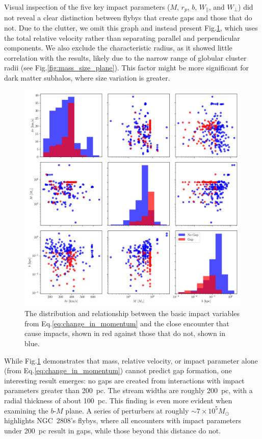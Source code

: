 \documentclass{aa}
\begin{document}
\begin{appendix}
      Visual inspection of the five key impact parameters ($M$, $r_p$, $b$, $W_\parallel$, and $W_\perp$) did not reveal a clear distinction between flybys that create gaps and those that do not. Due to the clutter, we omit this graph and instead present Fig.\ref{fig:impact_geometry_statistics}, which uses the total relative velocity rather than separating parallel and perpendicular components. We also exclude the characteristic radius, as it showed little correlation with the results, likely due to the narrow range of globular cluster radii (see Fig.\ref{fig:mass_size_plane}). This factor might be more significant for dark matter subhalos, where size variation is greater.
      
      
      \begin{figure}
        \centering
        \includegraphics[width=\linewidth]{impact_geometry_statistics.png}
        \caption{The distribution and relationship between the basic impact variables from Eq.\ref{eq:change_in_momentum} and the close encounter that cause impacts, shown in red against those that do not, shown in blue. }
        \label{fig:impact_geometry_statistics}    
        \end{figure}

      While Fig.\ref{fig:impact_geometry_statistics} demonstrates that mass, relative velocity, or impact parameter alone (from Eq.\ref{eq:change_in_momentum}) cannot predict gap formation, one interesting result emerges: no gaps are created from interactions with impact parameters greater than 200~pc. The stream widths are roughly 200~pc, with a radial thickness of about 100~pc. This finding is even more evident when examining the $b$-$M$ plane. A series of perturbers at roughly $\sim7 \times 10^5 M_\odot$ highlights NGC~2808's flybys, where all encounters with impact parameters under 200~pc result in gaps, while those beyond this distance do not.
        

\end{appendix}
\end{document}
